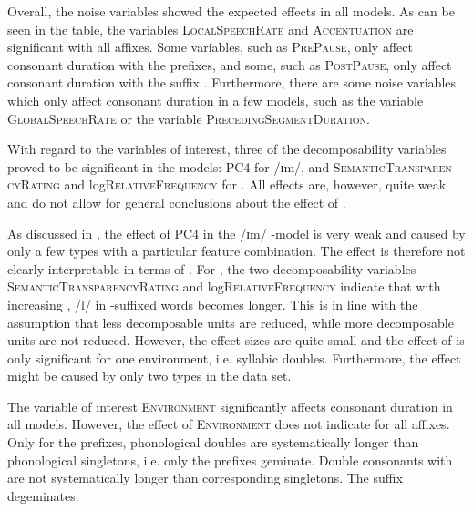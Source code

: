 Overall, the noise variables showed the expected effects in all models. As can be seen in the table, the variables \textsc{LocalSpeechRate} and \textsc{Accentuation} are significant with all affixes. 
Some variables, such as \textsc{PrePause}, only affect consonant duration with the prefixes, and some, such as \textsc{PostPause}, only affect consonant duration with the suffix .  
 Furthermore, there are some noise variables which only affect consonant duration in a few models, such as the variable \textsc{GlobalSpeechRate} or the variable \textsc{PrecedingSegmentDuration}. 

With regard to the variables of interest, three of the decomposability variables proved to be significant in the models: \textsc{PC4} for /ɪm/, and \textsc{SemanticTransparen- cyRating} and log\textsc{RelativeFrequency} for . 
 All effects are, however, quite weak and do not allow for general conclusions about the effect of . 
 
 As discussed in , the effect of \textsc{PC4} in the /ɪm/ -model is very weak and caused by only a few types with a particular feature combination. The effect is therefore not clearly interpretable in terms of . 
 For , the two decomposability variables \textsc{SemanticTransparencyRating} and log\textsc{RelativeFr\-equency} indicate that with increasing , /l/ in -suffixed words becomes longer. This is in line with the assumption that less decomposable units are reduced, while more decomposable units are not reduced. However, the effect sizes are quite small and the effect of  is only significant for one environment, i.e. syllabic doubles. 
Furthermore, the effect might be caused by only two types in the data set.


%
The variable of interest \textsc{Environment} significantly affects consonant duration in all models. 
However, the effect of \textsc{Environment} does not indicate  for all affixes. Only for the prefixes, phonological doubles are systematically longer than phonological singletons, i.e. only the prefixes geminate. Double consonants with  are not systematically longer than corresponding singletons. The suffix  degeminates.  


